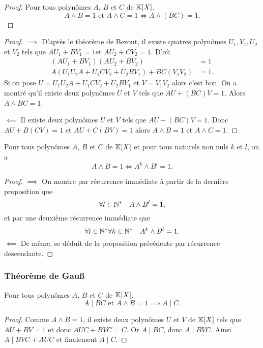 \begin{proof}
  Pour tous polynômes $A$, $B$ et $C$ de $\mathbb{K}[X]$,
  \begin{equation}
    A \wedge B =1 \text{~et~} A \wedge C=1 \iff A \wedge (BC) =1.
  \end{equation}
\end{proof}
\begin{proof}
  $\implies$ D'après le théorème de Bezout, il existe quatres polynômes $U_1,V_1,U_2$ et $V_2$ tels que $AU_1+BV_1=1$et $AU_2+CV_2=1$. D'où
  \begin{align}
    (AU_1+BV_1)(AU_2+BV_2)&=1\\
    A(U_1U_2A+U_1CV_2+U_2BV_1)+BC(V_1V_2)&=1.
  \end{align}
  Si on pose $U=U_1U_2A+U_1CV_2+U_2BV_1$ et $V=V_1V_2$ alors c'est bon. On a montré qu'il existe deux polynômes $U$ et $V$ tels que $AU+(BC)V=1$. Alors $A \wedge BC=1$.

  $\impliedby$ Il existe deux polynômes $U$ et $V$ tels que $AU+(BC)V=1$. Donc $AU+B(CV)=1$ et $AU+C(BV)=1$ alors $A \wedge B=1$ et $A \wedge C=1$.
\end{proof}

\begin{prop}
  Pour tous polynômes $A$, $B$ et $C$ de $\mathbb{K}[X]$ et pour tous naturels non nuls $k$ et $l$, on a
  \begin{equation}
    A \wedge B =1 \iff A^k \wedge B^l = 1.
  \end{equation}
\end{prop}
\begin{proof}
  $\implies$ On montre par récurrence immédiate à partir de la dernière proposition que
  \begin{equation}
    \forall l \in \mathbb{N}^* \quad A \wedge B^l = 1,
  \end{equation}
  et par une deuxième récurrence immédiate que
  \begin{equation}
    \forall l \in \mathbb{N}^* \forall k \in \mathbb{N}^* \quad A^k \wedge B^l = 1.
  \end{equation}
  $\impliedby$  De même, se déduit de la proposition précédente par récurrence descendante.
\end{proof}

\subsubsection{Théorème de Gau\ss}

\begin{theo}
  Pour tous polynômes $A$, $B$ et $C$ de $\mathbb{K}[X]$,
  \begin{equation}
    A\mid{}BC \text{~et~} A\wedge B=1 \implies A\mid{}C.
  \end{equation}
\end{theo}
\begin{proof}
  Comme $A \wedge B=1$, il existe deux polynômes $U$ et $V$ de $\mathbb{K}[X]$ tels que $AU+BV=1$ et donc $AUC+BVC=C$. Or $A\mid{}BC$, donc $A\mid{}BVC$. Ainsi $A\mid{}BVC+AUC$ et finalement $A\mid{}C$.
\end{proof}

